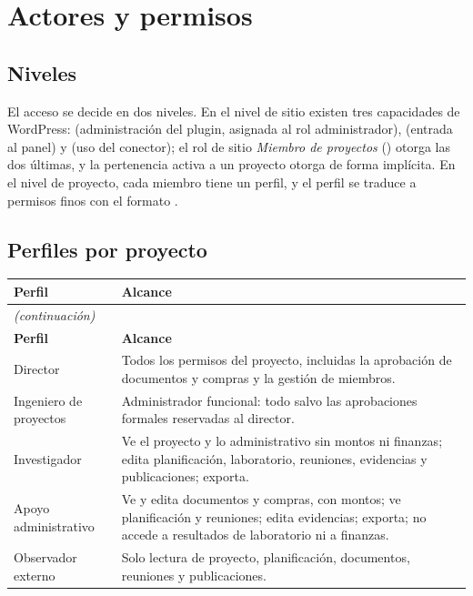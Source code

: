 \documentclass[11pt,a4paper]{article}
\newcommand{\continuacion}[1]{\multicolumn{#1}{l}{\small\itshape (continuación)}\\}
\begin{document}
\section{Actores y permisos}

\subsection{Niveles}

El acceso se decide en dos niveles. En el nivel de sitio existen tres capacidades de WordPress:  (administración del plugin, asignada al rol administrador),  (entrada al panel) y  (uso del conector); el rol de sitio \emph{Miembro de proyectos} () otorga las dos últimas, y la pertenencia activa a un proyecto otorga  de forma implícita. En el nivel de proyecto, cada miembro tiene un perfil, y el perfil se traduce a permisos finos con el formato .

\subsection{Perfiles por proyecto}

\begin{longtable}{p{3.2cm}p{11.6cm}}
\toprule
\textbf{Perfil} & \textbf{Alcance} \\
\midrule
\endfirsthead
\continuacion{2}
\toprule
\textbf{Perfil} & \textbf{Alcance} \\
\midrule
\endhead
Director & Todos los permisos del proyecto, incluidas la aprobación de documentos y compras y la gestión de miembros. \\
Ingeniero de proyectos & Administrador funcional: todo salvo las aprobaciones formales reservadas al director. \\
Investigador & Ve el proyecto y lo administrativo sin montos ni finanzas; edita planificación, laboratorio, reuniones, evidencias y publicaciones; exporta. \\
Apoyo administrativo & Ve y edita documentos y compras, con montos; ve planificación y reuniones; edita evidencias; exporta; no accede a resultados de laboratorio ni a finanzas. \\
Observador externo & Solo lectura de proyecto, planificación, documentos, reuniones y publicaciones. \\
\bottomrule
\end{longtable}
\end{document}
